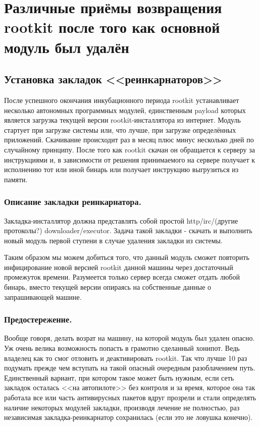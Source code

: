 \section{Различные приёмы возвращения rootkit после того как основной модуль был удалён}

\subsection{Установка закладок <<реинкарнаторов>>}

После успешного окончания инкубационного периода rootkit устанавливает
несколько автономных  программных модулей, единственным payload которых
является загрузка текущей версии rootkit-инсталлятора  из интернет.
Модуль стартует при загрузке системы или, что лучше, при загрузке
определённых приложений.  Скачивание происходит раз в месяц плюс минус
несколько дней по случайному принципу. После того как rootkit скачан он
обращается к серверу за инструкциями и, в зависимости от решения
принимаемого на сервере получает к исполнению тот или иной бинарь или
получает инструкцию выгрузиться из памяти.


\subsubsection{Описание закладки реинкарнатора.}

Закладка-инсталлятор должна представлять собой простой http/irc/(другие
протоколы?) downloader/executor. Задача такой закладки - скачать и
выполнить новый модуль первой ступени в случае удаления закладки из
системы.

Таким образом мы можем добиться того, что данный модуль сможет повторить
инфицирование новой  версией rootkit данной машины через достаточный
промежуток времени. Разумеется только сервер всегда сможет отдать любой
бинарь, вместо текущей версии опираясь на собственные данные о
запрашивающей машине.

\subsubsection{Предостережение.}

Вообще говоря, делать возрат на машину, на которой модуль был удален
опасно. Уж очень велика возможность попасть в грамотно сделанный хонипот.
Ведь владелец как то смог отловить и деактивировать rootkit. Так что лучше
10 раз подумать прежде чем вступать на такой опасный очередным разоблачением
путь. Единственный вариант, при котором такое может быть нужным, если сеть
закладок осталась <<на автопилоте>> без контроля и за время, которое она так
работала все или часть антивирусных пакетов вдруг прозрели и стали определять
наличие некоторых модулей закладки, производя лечение не полностью, раз
независимая закладка-реинкарнатор сохранилась (если это не ловушка конечно).



